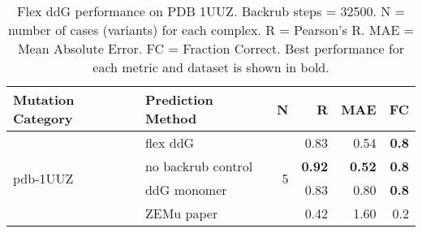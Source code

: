 \begin{table}
  \begin{tabular}{llrrrr}
\toprule
Mutation Category &   Prediction Method &  N &    R &  MAE &  FC \\
\midrule
 \multirow{ 4}{*}{pdb-1UUZ} & flex ddG & \multirow{ 4}{*}{5} & 0.83 & 0.54 & \textbf{0.8}  \\
 & no backrub control & & \textbf{0.92} & \textbf{0.52} & \textbf{0.8}  \\
 & ddG monomer & & 0.83 & 0.80 & \textbf{0.8}  \\
 & ZEMu paper & & 0.42 & 1.60 & 0.2  \\
\bottomrule
\end{tabular}
  \caption[Flex ddG performance on PDB 1UUZ]{
    Flex ddG performance on PDB 1UUZ. Backrub steps = 32500. N = number of cases (variants) for each complex. R = Pearson's R. MAE = Mean Absolute Error. FC = Fraction Correct. Best performance for each metric and dataset is shown in bold.
  } \label{tab:table-pdb-1UUZ}
\end{table}
